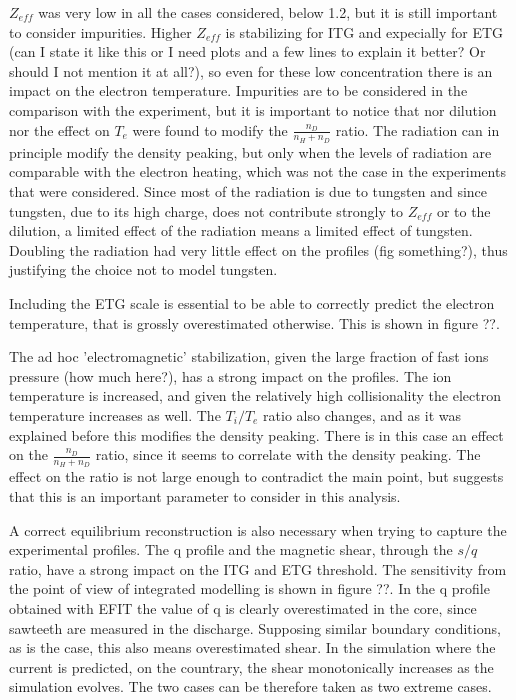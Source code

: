 \documentclass[a4paper,10pt]{iopart}
\begin{document}
$ Z_{eff} $ was very low in all the cases considered, below 1.2, but it is still important to consider impurities. Higher $ Z_{eff} $ is stabilizing for ITG and expecially for ETG (can I state it like this or I need plots and a few lines to explain it better? Or should I not mention it at all?), so even for these low concentration there is an impact on the electron temperature. Impurities are to be considered in the comparison with the experiment, but it is important to notice that nor dilution nor the effect on $ T_{e} $ were found to modify the $ \frac{n_{D}}{n_{H} + n_{D}} $ ratio.
The radiation can in principle modify the density peaking, but only when the levels of radiation are comparable with the electron heating, which was not the case in the experiments that were considered. Since most of the radiation is due to tungsten and since tungsten, due to its high charge, does not contribute strongly to $ Z_{eff} $ or to the dilution, a limited effect of the radiation means a limited effect of tungsten. Doubling the radiation had very little effect on the profiles (fig something?), thus justifying the choice not to model tungsten.

Including the ETG scale is essential to be able to correctly predict the electron temperature, that is grossly overestimated otherwise. This is shown in figure ??.

The ad hoc 'electromagnetic' stabilization, given the large fraction of fast ions pressure (how much here?), has a strong impact on the profiles. The ion temperature is increased, and given the relatively high collisionality the electron temperature increases as well. The $T_{i}/T_{e} $ ratio also changes, and as it was explained before this modifies the density peaking. There is in this case an effect on the $ \frac{n_{D}}{n_{H} + n_{D}} $ ratio, since it seems to correlate with the density peaking. The effect on the ratio is not large enough to contradict the main point, but suggests that this is an important parameter to consider in this analysis.

A correct equilibrium reconstruction is also necessary when trying to capture the experimental profiles. The q profile and the magnetic shear, through the $s/q $ ratio, have a strong impact on the ITG and ETG threshold. The sensitivity from the point of view of integrated modelling is shown in figure ??. In the q profile obtained with EFIT the value of q is clearly overestimated in the core, since sawteeth are measured in the discharge. Supposing similar boundary conditions, as is the case, this also means overestimated shear. In the simulation where the current is predicted, on the countrary, the shear monotonically increases as the simulation evolves. The two cases can be therefore taken as two extreme cases.
\end{document}
